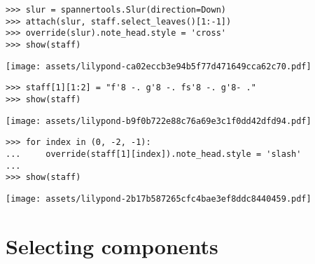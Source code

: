 \begin{abjadbookoutput}
\begin{singlespacing}
\vspace{-0.5\baselineskip}
\begin{lstlisting}
>>> slur = spannertools.Slur(direction=Down)
>>> attach(slur, staff.select_leaves()[1:-1])
>>> override(slur).note_head.style = 'cross'
>>> show(staff)
\end{lstlisting}
\noindent\texttt{[image: assets/lilypond-ca02eccb3e94b5f77d471649cca62c70.pdf]}
\end{singlespacing}
\end{abjadbookoutput}

\begin{comment}
<abjad>
staff[1][1:2] = "f'8 -. g'8 -. fs'8 -. g'8- ."
show(staff)
</abjad>
\end{comment}

\begin{abjadbookoutput}
\begin{singlespacing}
\vspace{-0.5\baselineskip}
\begin{lstlisting}
>>> staff[1][1:2] = "f'8 -. g'8 -. fs'8 -. g'8- ."
>>> show(staff)
\end{lstlisting}
\noindent\texttt{[image: assets/lilypond-b9f0b722e88c76a69e3c1f0dd42dfd94.pdf]}
\end{singlespacing}
\end{abjadbookoutput}

\begin{comment}
<abjad>
for index in (0, -2, -1):
    override(staff[1][index]).note_head.style = 'slash'

show(staff)
</abjad>
\end{comment}

\begin{abjadbookoutput}
\begin{singlespacing}
\vspace{-0.5\baselineskip}
\begin{lstlisting}
>>> for index in (0, -2, -1):
...     override(staff[1][index]).note_head.style = 'slash'
...
>>> show(staff)
\end{lstlisting}
\noindent\texttt{[image: assets/lilypond-2b17b587265cfc4bae3ef8ddc8440459.pdf]}
\end{singlespacing}
\end{abjadbookoutput}

\section{Selecting components}

